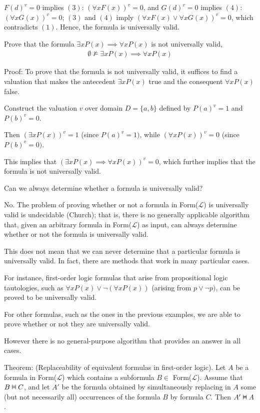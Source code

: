 \documentclass{article}
\newcommand{\vDashv}{%
  \mathrel{%
    \text{%
      \ooalign{$\vDash$\cr\reflectbox{$\vDash$}\cr}%
    }%
  }%
}
\begin{document}
$F(d)^v = 0$ implies $(3)$: $(\forall x F(x))^v = 0$, and $G(d)^v = 0$ implies $(4)$: $(\forall x G(x))^v = 0$; $(3)$ and $(4)$ imply $(\forall x F(x) \vee \forall x G(x))^v = 0$, which contradicts $(1)$. Hence, the formula is universally valid.

Prove that the formula $\exists x P(x) \implies \forall x P(x)$ is not universally valid, 
\begin{align*}
\emptyset \not\vDash \exists x P(x) \implies \forall x P(x)
\end{align*}

Proof: To prove that the formula is not universally valid, it suffices to find a valuation that makes the antecedent $\exists x P(x)$ true and the consequent $\forall x P(x)$ false.

Construct the valuation $v$ over domain $D = \{a,b\}$ defined by $P(a)^v = 1$ and $P(b)^v = 0$. 

Then $(\exists x P(x))^v = 1$ (since $P(a)^v = 1)$, while $(\forall x P(x))^v = 0$ (since $P(b)^v = 0)$.

This implies that $(\exists x P(x) \implies \forall x P(x))^v = 0$, which further implies that the formula is not universally valid.

Can we always determine whether a formula is universally valid?

No. The problem of proving whether or not a formula in Form($\mathcal{L}$) is universally valid is undecidable (Church); that is, there is no generally applicable algorithm that, given an arbitrary formula in Form($\mathcal{L}$) as input, can always determine whether or not the formula is universally valid.

This does not mean that we can never determine that a particular formula is universally valid. In fact, there are methods that work in many particular cases.

For instance, first-order logic formulas that arise from propositional logic tautologies, such as $\forall x P(x) \vee \neg (\forall x P(x))$ (arising from $p \vee \neg p)$, can be proved to be universally valid.

For other formulas, such as the ones in the previous examples, we are able to prove whether or not they are universally valid.

However there is no general-purpose algorithm that provides an answer in all cases.

Theorem: (Replaceability of equivalent formulas in first-order logic). Let $A$ be a formula in Form($\mathcal{L}$) which contains a subformula $B \in$ Form($\mathcal{L}$). Assume that $B \vDashv C$, and let $A'$ be the formula obtained by simultaneously replacing in $A$ some (but not necessarily all) occurrences of the formula $B$ by formula $C$. Then $A' \vDashv A$.
\end{document}
